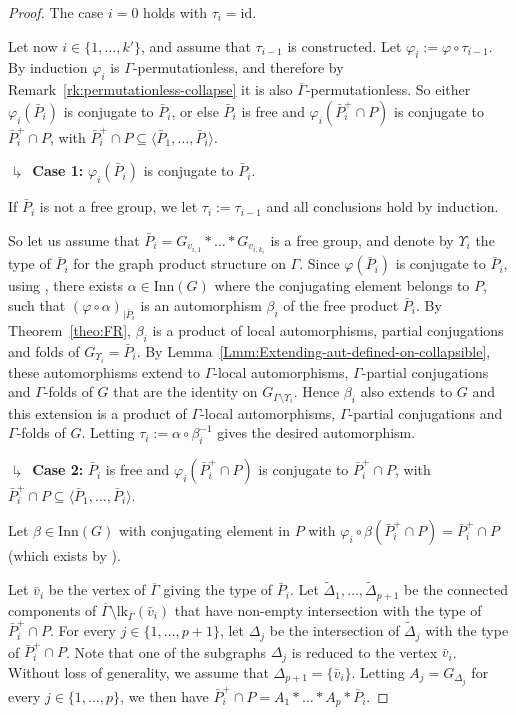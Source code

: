 \documentclass[a4paper,english,11pt]{article}
\theoremstyle{definition}
\theoremstyle{remark}
\newcommand{\lk}{\mathrm{lk}}
\newcommand{\Inn}{\mathrm{Inn}}
\begin{document}
\begin{proof}
\medskip

The case $i=0$ holds with $\tau_i=\mathrm{id}$. 

Let now $i\in\{1,\dots,k'\}$, and assume that $\tau_{i-1}$ is constructed. Let $\varphi_i:=\varphi\circ\tau_{i-1}$. By induction $\varphi_i$ is $\Gamma$-permutationless, and therefore by Remark~\ref{rk:permutationless-collapse} it is also $\overline{\Gamma}$-permutationless. So either $\varphi_i(\bar P_i)$ is conjugate to $\bar P_i$, or else $\bar P_i$ is free and $\varphi_i(\bar P_i^+\cap P)$ is conjugate to $\bar P_i^+\cap P$, with $\bar P_i^+\cap P\subseteq\langle \bar P_1,\dots,\bar P_i\rangle$.

\medskip

\textbf{$\drsh$ Case 1:} $\varphi_i(\bar{P}_i)$ is conjugate to $\bar P_i$. 

If $\bar P_i$ is not a free group, we let $\tau_i:=\tau_{i-1}$ and all conclusions hold by induction.

So let us assume that $\bar P_i=G_{v_{i,1}}\ast\dots\ast G_{v_{i,k_i}}$ is a free group, and denote by $\Upsilon_i$ the type of $\bar P_i$ for the graph product structure on $\Gamma$. Since $\varphi(\bar{P}_i)$ is conjugate to $\bar{P}_i$, using \cite[Proposition~3.4]{AM}, there exists $\alpha\in \mathrm{Inn}(G)$ where the conjugating element belongs to $P$, such that $(\varphi\circ \alpha)_{|\bar{P}_i}$ is an automorphism $\beta_i$ of the free product $\bar{P}_i$. By Theorem~\ref{theo:FR}, $\beta_i$ is a product of local automorphisms, partial conjugations and folds of $G_{\Upsilon_i}=\bar{P}_i$. By Lemma~\ref{Lmm:Extending-aut-defined-on-collapsible}, these automorphisms extend to $\Gamma$-local automorphisms, $\Gamma$-partial conjugations and $\Gamma$-folds of $G$ that are the identity on $G_{\Gamma\setminus\Upsilon_i}$. Hence $\beta_i$ also extends to $G$ and this extension is a product of $\Gamma$-local automorphisms, $\Gamma$-partial conjugations and $\Gamma$-folds of $G$. Letting  $\tau_i:=\alpha\circ \beta_i^{-1}$ gives the desired automorphism. 

\medskip 

\textbf{$\drsh$ Case 2:} $\bar P_i$ is free and $\varphi_i(\bar P_i^+\cap P)$ is conjugate to $\bar P_i^+\cap P$, with $\bar P_i^+\cap P\subseteq \langle \bar P_1,\dots,\bar P_i\rangle$. 

Let $\beta\in\Inn(G)$ with conjugating element in $P$ with $\varphi_i\circ\beta(\bar P_i^+\cap P)=\bar P_i^+\cap P$ (which exists by \cite[Lemma~3.7]{AM}).

Let $\bar{v}_i$ be the vertex of $\overline\Gamma$ giving the type of $\bar P_i$. Let $\tilde{\Delta}_1,\dots,\tilde{\Delta}_{p+1}$ be the connected components of $\overline{\Gamma}\setminus\lk_{\overline\Gamma}(\bar{v}_i)$ that have non-empty intersection with the type of $\bar P_i^+\cap P$. For every $j\in\{1,\dots,p+1\}$, let $\Delta_j$ be the intersection of $\tilde\Delta_j$ with the type of $\bar P_i^+\cap P$. Note that one of the subgraphs $\Delta_j$ is reduced to the vertex $\bar{v}_i$. Without loss of generality, we assume that $\Delta_{p+1}=\{\bar{v}_i\}$. Letting $A_j= G_{\Delta_j}$ for every $j\in\{1,\dots,p\}$, we then have $\bar P_i^+\cap P=A_1\ast\dots\ast A_p\ast \bar P_i$.


\end{proof}
\end{document}
